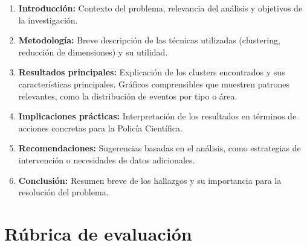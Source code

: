 \documentclass[a4,11pt]{aleph-notas}
\begin{document}
\begin{enumerate}[leftmargin=*, label={\textbf{\arabic*.}}]

\item \textbf{Introducción:} Contexto del problema, relevancia del análisis y objetivos de la investigación.

\item \textbf{Metodología:} Breve descripción de las técnicas utilizadas (clustering, reducción de dimensiones) y su utilidad.

\item \textbf{Resultados principales:} Explicación de los clusters encontrados y sus características principales. Gráficos comprensibles que muestren patrones relevantes, como la distribución de eventos por tipo o área.

\item \textbf{Implicaciones prácticas:} Interpretación de los resultados en términos de acciones concretas para la Policía Científica.

\item \textbf{Recomendaciones:} Sugerencias basadas en el análisis, como estrategias de intervención o necesidades de datos adicionales.

\item \textbf{Conclusión:} Resumen breve de los hallazgos y su importancia para la resolución del problema.

\end{enumerate}


\section{Rúbrica de evaluación}
\end{document}
